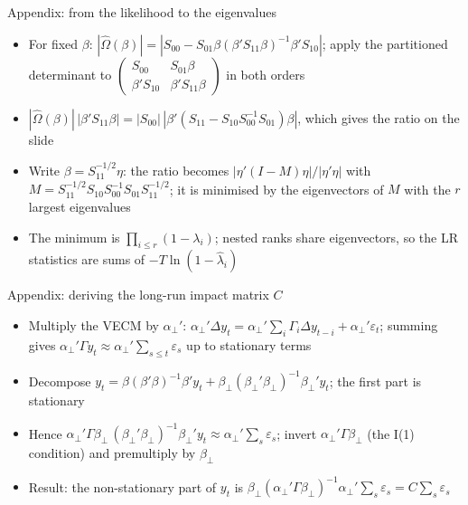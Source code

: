 \begin{frame}{Appendix: from the likelihood to the eigenvalues}
\hypertarget{atsapp1}{}
\itemsize{\small}
\begin{itemize}
    \item For fixed $\beta$: $|\hat\Omega(\beta)| = |S_{00} - S_{01}\beta(\beta'S_{11}\beta)^{-1}\beta'S_{10}|$; apply the partitioned determinant to $\begin{pmatrix}S_{00} & S_{01}\beta\\ \beta'S_{10} & \beta'S_{11}\beta\end{pmatrix}$ in both orders
    \item $|\hat\Omega(\beta)|\,|\beta'S_{11}\beta| = |S_{00}|\,|\beta'(S_{11} - S_{10}S_{00}^{-1}S_{01})\beta|$, which gives the ratio on the slide
    \item Write $\beta = S_{11}^{-1/2}\eta$: the ratio becomes $|\eta'(I - M)\eta|/|\eta'\eta|$ with $M = S_{11}^{-1/2}S_{10}S_{00}^{-1}S_{01}S_{11}^{-1/2}$; it is minimised by the eigenvectors of $M$ with the $r$ largest eigenvalues
    \item The minimum is $\prod_{i\le r}(1 - \lambda_i)$; nested ranks share eigenvectors, so the LR statistics are sums of $-T\ln(1 - \hat\lambda_i)$
\end{itemize}
\end{frame}

\begin{frame}{Appendix: deriving the long-run impact matrix $C$}
\hypertarget{atsapp2}{}
\itemsize{\small}
\begin{itemize}
    \item Multiply the VECM by $\alpha_\perp'$: $\alpha_\perp'\Delta y_t = \alpha_\perp'\sum_i\Gamma_i\Delta y_{t-i} + \alpha_\perp'\varepsilon_t$; summing gives $\alpha_\perp'\Gamma y_t \approx \alpha_\perp'\sum_{s\le t}\varepsilon_s$ up to stationary terms
    \item Decompose $y_t = \beta(\beta'\beta)^{-1}\beta'y_t + \beta_\perp(\beta_\perp'\beta_\perp)^{-1}\beta_\perp'y_t$; the first part is stationary
    \item Hence $\alpha_\perp'\Gamma\beta_\perp\,(\beta_\perp'\beta_\perp)^{-1}\beta_\perp'y_t \approx \alpha_\perp'\sum_s\varepsilon_s$; invert $\alpha_\perp'\Gamma\beta_\perp$ (the I(1) condition) and premultiply by $\beta_\perp$
    \item Result: the non-stationary part of $y_t$ is $\beta_\perp(\alpha_\perp'\Gamma\beta_\perp)^{-1}\alpha_\perp'\sum_s\varepsilon_s = C\sum_s\varepsilon_s$
\end{itemize}
\end{frame}


